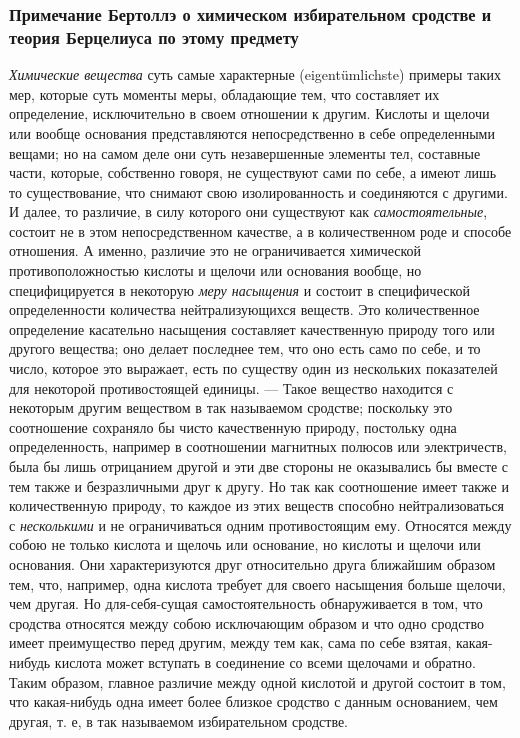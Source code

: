 \subsubsection[Примечание Бертоллэ о химическом избирательном сродстве и теория Берцелиуса по этому предмету]
{Примечание Бертоллэ о химическом избирательном сродстве и теория Берцелиуса по этому предмету}

{\em Химические вещества} суть самые характерные
(eigentümlichste) примеры таких мер, которые суть моменты меры, обладающие
тем, что составляет их определение, исключительно в своем отношении к
другим. Кислоты и щелочи или вообще основания представляются
непосредственно в себе определенными вещами; но на самом деле они суть
незавершенные элементы тел, составные части, которые, собственно говоря, не
существуют сами по себе, а имеют лишь то существование, что снимают свою
изолированность и соединяются с другими. И далее, то различие, в силу
которого они существуют как {\em самостоятельные},
состоит не в этом непосредственном качестве, а в количественном роде и
способе отношения. А именно, различие это не ограничивается химической
противоположностью кислоты и щелочи или основания вообще, но
специфицируется в некоторую {\em меру насыщения} и
состоит в специфической определенности количества нейтрализующихся веществ.
Это количественное определение касательно насыщения составляет качественную
природу того или другого вещества; оно делает последнее тем, что оно есть
само по себе, и то число, которое это выражает, есть по существу один из
нескольких показателей для некоторой противостоящей единицы. — Такое
вещество находится с некоторым другим веществом в так называемом сродстве;
поскольку это соотношение сохраняло бы чисто качественную природу,
постольку одна определенность, например в соотношении магнитных полюсов или
электричеств, была бы лишь отрицанием другой и эти две стороны не
оказывались бы вместе с тем также и безразличными друг к другу. Но так как
соотношение имеет также и количественную природу, то каждое из этих веществ
способно нейтрализоваться с {\em несколькими} и не
ограничиваться одним противостоящим ему. Относятся между собою не только
кислота и щелочь или основание, но кислоты и щелочи или основания. Они
характеризуются друг относительно друга ближайшим образом тем, что,
например, одна кислота требует для своего насыщения больше щелочи, чем
другая. Но для-себя-сущая самостоятельность обнаруживается в том, что
сродства относятся между собою исключающим образом и что одно сродство
имеет преимущество перед другим, между тем как, сама по себе взятая,
какая-нибудь кислота может вступать в соединение со всеми щелочами и
обратно. Таким образом, главное различие между одной кислотой и другой
состоит в том, что какая-нибудь одна имеет более близкое сродство с данным
основанием, чем другая, т. е, в так называемом избирательном сродстве.

